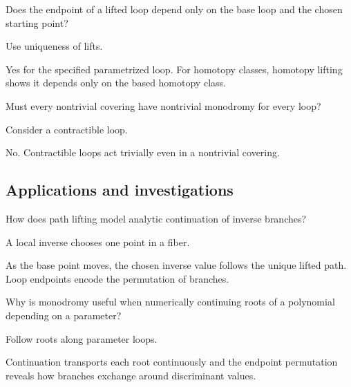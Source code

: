\begin{exercise}\label{exr:iv23-expand-11}
Does the endpoint of a lifted loop depend only on the base loop and the chosen starting point?
\end{exercise}
\begin{hint}
Use uniqueness of lifts.
\end{hint}
\begin{solution}
Yes for the specified parametrized loop. For homotopy classes, homotopy lifting shows it depends only on the based homotopy class.
\end{solution}

\begin{exercise}\label{exr:iv23-expand-12}
Must every nontrivial covering have nontrivial monodromy for every loop?
\end{exercise}
\begin{hint}
Consider a contractible loop.
\end{hint}
\begin{solution}
No. Contractible loops act trivially even in a nontrivial covering.
\end{solution}

\subsection*{Applications and investigations}

\begin{exercise}\label{exr:iv23-expand-13}
How does path lifting model analytic continuation of inverse branches?
\end{exercise}
\begin{hint}
A local inverse chooses one point in a fiber.
\end{hint}
\begin{solution}
As the base point moves, the chosen inverse value follows the unique lifted path. Loop endpoints encode the permutation of branches.
\end{solution}

\begin{exercise}\label{exr:iv23-expand-14}
Why is monodromy useful when numerically continuing roots of a polynomial depending on a parameter?
\end{exercise}
\begin{hint}
Follow roots along parameter loops.
\end{hint}
\begin{solution}
Continuation transports each root continuously and the endpoint permutation reveals how branches exchange around discriminant values.
\end{solution}


